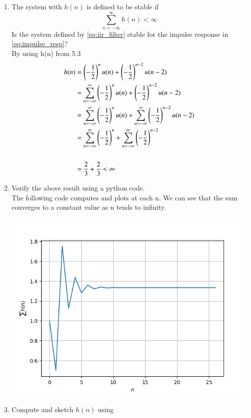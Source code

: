 \documentclass[journal,12pt,twocolumn]{IEEEtran}
\renewcommand\thesection{\arabic{section}}
\begin{document}
\begin{enumerate}[label=\thesection.\arabic*]
\item The system with $h(n)$ is defined to be stable if
\begin{equation}
\sum_{n=-\infty}^{\infty}h(n) < \infty
\end{equation}
Is the system defined by \eqref{eq:iir_filter} stable for the impulse response in \eqref{eq:impulse_resp}?
\\
\solution By using h(n) from 5.3
\begin{align}
h(n) &= \left(-\frac{1}{2}\right)^{n}u(n) + \left(-\frac{1}{2}\right)^{n-2}u(n-2)
\\
&= \sum_{n=-\infty}^{\infty} \left(-\frac{1}{2}\right)^{n}u(n) + \left(-\frac{1}{2}\right)^{n-2}u(n-2)
\\
&= \sum_{n=-\infty}^{\infty} \left(-\frac{1}{2}\right)^{n}u(n) + \sum_{n=-\infty}^{\infty}  \left(-\frac{1}{2}\right)^{n-2}u(n-2) 
\\
&= \sum_{n=-\infty}^{\infty} \left(-\frac{1}{2}\right)^{n} + \sum_{n=-\infty}^{\infty}  \left(-\frac{1}{2}\right)^{n-2}
\\
\\
&= \frac{2}{3} + \frac{2}{3} < \infty 
\end{align}
%
\item Verify the above result using a python code.
\\\solution
The following code computes and plots at each n. We can see that the sum converges to a constant value as n tends to infinity.

\includegraphics[width=\columnwidth]{figures/Figure_5_6_new.png}
\item 
Compute and sketch $h(n)$ using 
\begin{equation}

\end{equation}
\end{enumerate}
\end{document}
